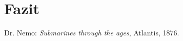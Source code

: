 \documentclass[a4paper,
DIV=13,
12pt,
BCOR=10mm,
department=FakEI,
parskip=half,
automark,
]{article}
\begin{document}
\section{Fazit}








\cleardoublepage
\begin{appendix}
\listoffigures

\cleardoublepage
\begin{thebibliography}{99}
 Dr. Nemo: \textit{Submarines through the ages}, Atlantis, 1876.
\end{thebibliography}

\cleardoublepage

\end{appendix}
\end{document}
